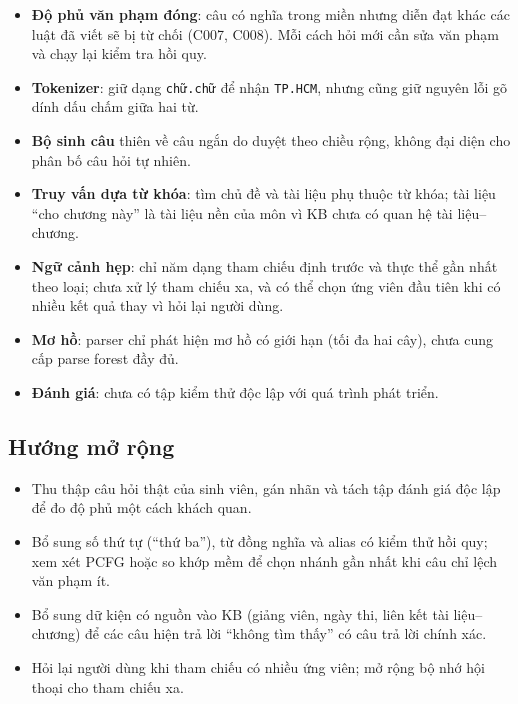 \begin{itemize}
  \item \textbf{Độ phủ văn phạm đóng}: câu có nghĩa trong miền nhưng diễn đạt khác các
        luật đã viết sẽ bị từ chối (C007, C008). Mỗi cách hỏi mới cần sửa văn phạm và
        chạy lại kiểm tra hồi quy.
  \item \textbf{Tokenizer}: giữ dạng \texttt{chữ.chữ} để nhận \texttt{TP.HCM}, nhưng
        cũng giữ nguyên lỗi gõ dính dấu chấm giữa hai từ.
  \item \textbf{Bộ sinh câu} thiên về câu ngắn do duyệt theo chiều rộng, không đại
        diện cho phân bố câu hỏi tự nhiên.
  \item \textbf{Truy vấn dựa từ khóa}: tìm chủ đề và tài liệu phụ thuộc từ khóa; tài
        liệu ``cho chương này'' là tài liệu nền của môn vì KB chưa có quan hệ tài
        liệu--chương.
  \item \textbf{Ngữ cảnh hẹp}: chỉ năm dạng tham chiếu định trước và thực thể gần nhất
        theo loại; chưa xử lý tham chiếu xa, và có thể chọn ứng viên đầu tiên khi có
        nhiều kết quả thay vì hỏi lại người dùng.
  \item \textbf{Mơ hồ}: parser chỉ phát hiện mơ hồ có giới hạn (tối đa hai cây), chưa
        cung cấp parse forest đầy đủ.
  \item \textbf{Đánh giá}: chưa có tập kiểm thử độc lập với quá trình phát triển.
\end{itemize}

\subsection{Hướng mở rộng}

\begin{itemize}
  \item Thu thập câu hỏi thật của sinh viên, gán nhãn và tách tập đánh giá độc lập để đo
        độ phủ một cách khách quan.
  \item Bổ sung số thứ tự (``thứ ba''), từ đồng nghĩa và alias có kiểm thử hồi quy; xem
        xét PCFG hoặc so khớp mềm để chọn nhánh gần nhất khi câu chỉ lệch văn phạm ít.
  \item Bổ sung dữ kiện có nguồn vào KB (giảng viên, ngày thi, liên kết tài liệu--chương)
        để các câu hiện trả lời ``không tìm thấy'' có câu trả lời chính xác.
  \item Hỏi lại người dùng khi tham chiếu có nhiều ứng viên; mở rộng bộ nhớ hội thoại
        cho tham chiếu xa.
\end{itemize}
